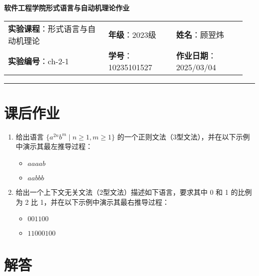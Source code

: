 \documentclass{article}
\begin{document}
	
	\begin{center}
		{\Large{\textbf{\heiti 软件工程学院形式语言与自动机理论作业}}}
		\begin{table}[htb]
			\flushleft
			\begin{tabular}{p{0.4\linewidth}p{0.27\linewidth}p{0.28\linewidth}}\\
				\textbf{实验课程}：形式语言与自动机理论  & \textbf{年级}：2023级       & \textbf{姓名}：顾翌炜  \\
				\textbf{实验编号}：ch-2-1    & \textbf{学号}：10235101527 & \textbf{作业日期}：2025/03/04  \\
			\end{tabular}
		\end{table}
	\end{center}
	\rule{\textwidth}{2pt}
	
	\section*{课后作业}
	
	\begin{enumerate}
		\item 给出语言 $\{a^{2n}b^m \mid n \geq 1, m \geq 1\}$ 的一个正则文法（3型文法），并在以下示例中演示其最左推导过程：
		\begin{itemize}
			\item $aaaab$
			\item $aabbb$
		\end{itemize}
		\item 给出一个上下文无关文法（2型文法）描述如下语言，要求其中 0 和 1 的比例为 2 比 1，并在以下示例中演示其最右推导过程：
		\begin{itemize}
			\item $001100$
			\item $11000100$
		\end{itemize}
	\end{enumerate}
	
	\section*{解答}
	
\end{document}
